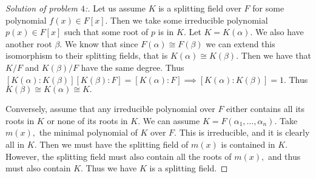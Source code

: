 \documentclass[letterpaper,11pt,twoside]{article}
\theoremstyle{proposition}
\theoremstyle{definition}
\theoremstyle{theorem}
\theoremstyle{definition}
\theoremstyle{definition}
\theoremstyle{definition}
\theoremstyle{lemma}
\theoremstyle{definition}
\theoremstyle{definition}
\theoremstyle{corollary}
\theoremstyle{definition}
\theoremstyle{definition}
\theoremstyle{definition}
\begin{document}
\begin{proof}[Solution of problem $4$:]
Let us assume $K$ is a splitting field over $F$ for some polynomial $f(x) \in F[x].$ Then we take some irreducible polynomial $p(x) \in F[x]$ such that some 
root of $p$ is in $K.$ Let $K=K(\alpha).$ We also have another root $\beta.$ We know that since $F(\alpha) \cong F(\beta)$ we can extend this isomorphism to 
their splitting fields, that is $K(\alpha) \cong K(\beta).$ Then we have that $K/F$ and $K(\beta)/F$ have the same degree. Thus 
$[K(\alpha):K(\beta)][K(\beta):F]=[K(\alpha):F] \implies [K(\alpha):K(\beta)]=1.$ Thus $K(\beta) \cong K(\alpha) \cong K.$

Conversely, assume that any irreducible polynomial over $F$ either contains all its roots in $K$ or none of its roots in $K.$ We can assume 
$K=F(\alpha_1,\dots, \alpha_n).$ Take $m(x),$ the minimal polynomial of $K$ over $F.$ This is irreducible, and it is clearly all in $K.$ Then we must have 
the splitting field of $m(x)$ is contained in $K.$ However, the splitting field must also contain all the roots of $m(x),$ and thus must also contain $K.$ 
Thus we have $K$ is a splitting field. 
\end{proof}
\end{document}
